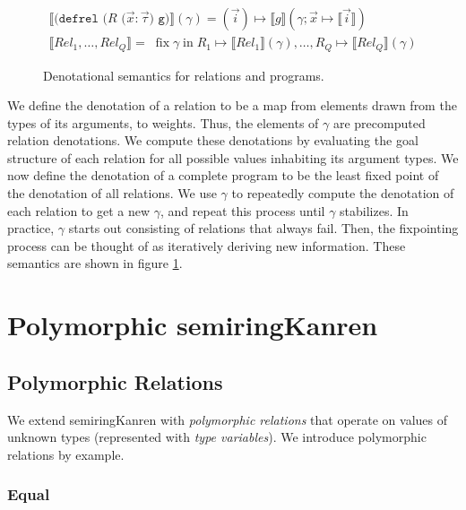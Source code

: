\documentclass{report}
\theoremstyle{definition}
\newcommand{\den}[1]{\llbracket #1 \rrbracket}
\begin{document}
\begin{figure}
\begin{gather*}
	\den{\texttt{(defrel (\(R\) (\(\vec x : \vec \tau\)) g)}} (\gamma) =
	(\vec i) \mapsto \den{g} (\gamma; \vec x \mapsto \den{\vec i}) \\
	\den{\textit{Rel}_1, \dots, \textit{Rel}_Q} = \;
	\mathrel{\textrm{fix}} \gamma \mathrel{\textrm{in}} R_1 \mapsto \den{\textit{Rel}_1} (\gamma), \dots, R_Q \mapsto \den{\textit{Rel}_Q} (\gamma)
\end{gather*}
\caption{Denotational semantics for relations and programs.}
\label{fig:relation-semantics}
\end{figure}

We define the denotation of a relation to be a map from elements drawn from the types of its arguments, to weights.
Thus, the elements of \(\gamma\) are precomputed relation denotations.
We compute these denotations by evaluating the goal structure of each relation for all possible values inhabiting its argument types.
We now define the denotation of a complete program to be the least fixed point of the denotation of all relations.
We use \(\gamma\) to repeatedly compute the denotation of each relation to get a new \(\gamma\), and repeat this process until \(\gamma\) stabilizes.
In practice, \(\gamma\) starts out consisting of relations that always fail.
Then, the fixpointing process can be thought of as iteratively deriving new information.
These semantics are shown in figure \ref{fig:relation-semantics}.

\chapter{Polymorphic semiringKanren}

\section{Polymorphic Relations}

We extend semiringKanren with \emph{polymorphic relations} that operate on values of unknown types (represented with \emph{type variables}).
We introduce polymorphic relations by example.

\subsection{Equal}
\end{document}
